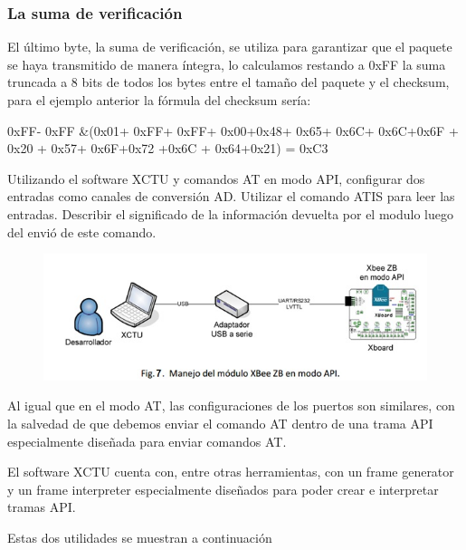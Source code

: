 \documentclass[11pt,oneside,spanish,a4paper]{article}
\begin{document}
\subsubsection{La suma de verificación}
El último byte, la suma de verificación, se utiliza para garantizar que el paquete se haya transmitido de manera íntegra, lo calculamos restando a 0xFF la suma truncada a 8 bits de todos los bytes entre el tamaño del paquete y el checksum, para el ejemplo anterior la fórmula del checksum sería:


0xFF- 0xFF \&(0x01+ 0xFF+ 0xFF+ 0x00+0x48+
0x65+ 0x6C+ 0x6C+0x6F + 0x20 +
0x57+ 0x6F+0x72 +0x6C + 0x64+0x21) = 0xC3


Utilizando el software XCTU y comandos AT en modo API, configurar dos entradas como canales de conversión AD. Utilizar el comando ATIS para leer las entradas. Describir el significado de la información devuelta por el modulo luego del envió de este comando.
\begin{figure}[ht]
	\centering
	\includegraphics[width=.6\textwidth]{img/IMAGEN07.jpg}
\end{figure}
Al igual que en el modo AT, las configuraciones de los puertos son similares, con la salvedad de que debemos enviar el comando AT dentro de una trama API especialmente diseñada para enviar comandos AT.

El software XCTU cuenta con, entre otras herramientas, con un frame generator y un frame interpreter especialmente diseñados para poder crear e interpretar tramas API.

Estas dos utilidades se muestran a continuación
\end{document}

